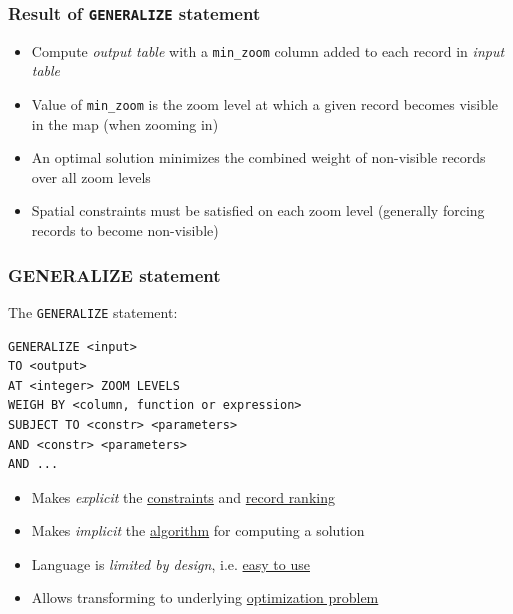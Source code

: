 \documentclass{beamer}
\begin{document}
\frame
{
  \frametitle{Result of \texttt{GENERALIZE} statement}
  \begin{itemize}
  \item Compute \emph{output table} with a \texttt{min\_zoom} column added to each record in \emph{input table}
  \item Value of \texttt{min\_zoom} is the zoom level at which a given record becomes visible in the map (when zooming in)
  \item An optimal solution minimizes the combined weight of non-visible records over all zoom levels
  \item Spatial constraints must be satisfied on each zoom level (generally forcing records to become non-visible)
  \end{itemize}
  \begin{center}
  \end{center}
}




\begin{frame}[fragile,t]
  \frametitle{GENERALIZE statement}

The \texttt{GENERALIZE} statement:
\begin{lstlisting}
GENERALIZE <input> 
TO <output> 
AT <integer> ZOOM LEVELS
WEIGH BY <column, function or expression>
SUBJECT TO <constr> <parameters>
AND <constr> <parameters>
AND ...
\end{lstlisting}    
\begin{itemize}
\item Makes \emph{explicit} the \underline{constraints} and \underline{record ranking}
\item Makes \emph{implicit} the \underline{algorithm} for computing a solution
\item Language is \emph{limited by design}, i.e. \underline{easy to use}
\item Allows transforming to underlying \underline{optimization problem}
\end{itemize}
\end{frame}
\end{document}
